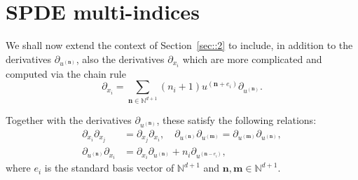 \documentclass[AHL,Unicode,longabstracts]{cedram}
\newcommand{\bn}{\mathbf{n}}
\newcommand{\bm}{\mathbf{m}}
\newcommand{\bbN}{\mathbb{N}}
\begin{document}
\section{SPDE multi-indices}
\label{sec::4}

We shall now extend the context of Section~\ref{sec::2} to include, in addition to the derivatives $\partial_{u^{(\bn)}}$, also the derivatives $\partial_{x_i}$ which are more complicated and computed via the chain rule
\[
\partial_{x_i}=\sum_{\bn\in\bbN^{d+1}}(n_i+1)u^{(\bn+e_i)}\partial_{u^{(\bn)}}.
\]

Together with the derivatives $\partial_{u^{(\bn)}}$, these satisfy the following relations:
\begin{equation}\label{relation_derivs}
\begin{aligned}
\partial_{x_i}\partial_{x_j} &=\partial_{x_j}\partial_{x_i},\quad \partial_{u^{(\bn)}}\partial_{u^{(
\bm)}}=\partial_{u^{(\bm)}}\partial_{u^{(\bn)}}, \\ \partial_{u^{(\bn)}}\partial_{x_i} & =\partial_{x_i}\partial_{u^{(\bn)}} + n_i \partial_{u^{(\bn-e_i)}},
\end{aligned}
\end{equation}
where $e_i$ is the standard basis vector of $\bbN^{d+1}$ and $ \bn, \bm \in \bbN^{d+1} $.
\end{document}

